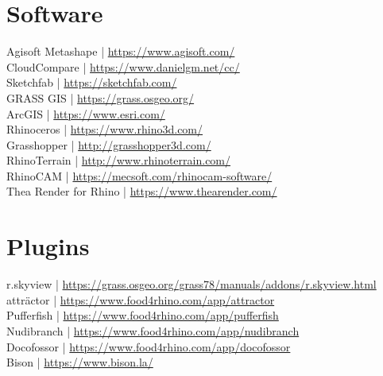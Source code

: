 \documentclass[11pt,article,oneside]{memoir}
\begin{document}
\section{Software}

Agisoft Metashape | \url{https://www.agisoft.com/} \\
CloudCompare | \url{https://www.danielgm.net/cc/} \\
Sketchfab | \url{https://sketchfab.com/} \\
GRASS GIS | \url{https://grass.osgeo.org/} \\
ArcGIS | \url{https://www.esri.com/} \\
Rhinoceros | \url{https://www.rhino3d.com/}\\
Grasshopper | \url{http://grasshopper3d.com/}\\
RhinoTerrain | \url{http://www.rhinoterrain.com/}\\
RhinoCAM | \url{https://mecsoft.com/rhinocam-software/}\\
Thea Render for Rhino | \url{https://www.thearender.com/}\\

\section{Plugins}
r.skyview | \url{https://grass.osgeo.org/grass78/manuals/addons/r.skyview.html}\\
attr{\"a}ctor | \url{https://www.food4rhino.com/app/attractor}\\
Pufferfish | \url{https://www.food4rhino.com/app/pufferfish}\\
Nudibranch | \url{https://www.food4rhino.com/app/nudibranch}\\
Docofossor | \url{https://www.food4rhino.com/app/docofossor}\\
Bison | \url{https://www.bison.la/}\\
\end{document}
